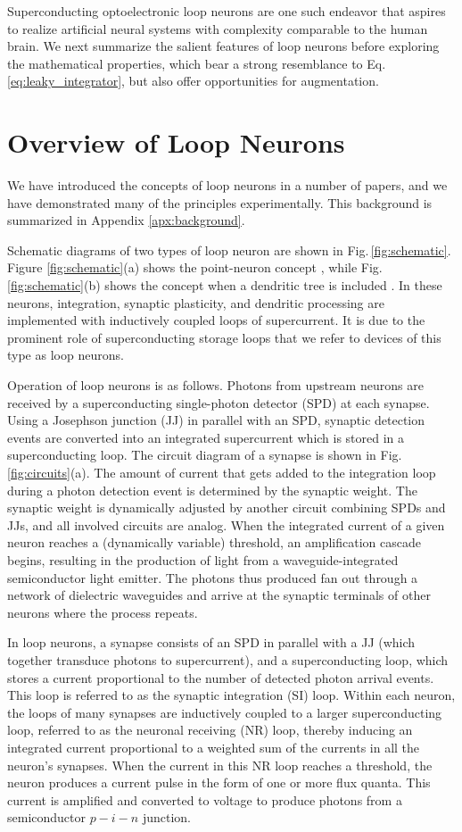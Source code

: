 \documentclass[twocolumn]{article}
\begin{document}
Superconducting optoelectronic loop neurons are one such endeavor that aspires to realize artificial neural systems with complexity comparable to the human brain. We next summarize the salient features of loop neurons before exploring the mathematical properties, which bear a strong resemblance to Eq.\,\ref{eq:leaky_integrator}, but also offer opportunities for augmentation.
 

\section{\label{sec:overview_of_loop_neurons}Overview of Loop Neurons}
We have introduced the concepts of loop neurons in a number of papers, and we have demonstrated many of the principles experimentally. This background is summarized in Appendix \ref{apx:background}. 

Schematic diagrams of two types of loop neuron are shown in Fig.\,\ref{fig:schematic}. Figure \ref{fig:schematic}(a) shows the point-neuron concept \cite{sh2018,sh2019_jap}, while Fig.\,\ref{fig:schematic}(b) shows the concept when a dendritic tree is included \cite{sh2019_jstqe}. In these neurons, integration, synaptic plasticity, and dendritic processing are implemented with inductively coupled loops of supercurrent. It is due to the prominent role of superconducting storage loops that we refer to devices of this type as loop neurons. 

Operation of loop neurons is as follows. Photons from upstream neurons are received by a superconducting single-photon detector (SPD) at each synapse. Using a Josephson junction (JJ) in parallel with an SPD, synaptic detection events are converted into an integrated supercurrent which is stored in a superconducting loop. The circuit diagram of a synapse is shown in Fig.\,\ref{fig:circuits}(a). The amount of current that gets added to the integration loop during a photon detection event is determined by the synaptic weight. The synaptic weight is dynamically adjusted by another circuit combining SPDs and JJs, and all involved circuits are analog. When the integrated current of a given neuron reaches a (dynamically variable) threshold, an amplification cascade begins, resulting in the production of light from a waveguide-integrated semiconductor light emitter. The photons thus produced fan out through a network of dielectric waveguides and arrive at the synaptic terminals of other neurons where the process repeats. 

In loop neurons, a synapse consists of an SPD in parallel with a JJ (which together transduce photons to supercurrent), and a superconducting loop, which stores a current proportional to the number of detected photon arrival events. This loop is referred to as the synaptic integration (SI) loop. Within each neuron, the loops of many synapses are inductively coupled to a larger superconducting loop, referred to as the neuronal receiving (NR) loop, thereby inducing an integrated current proportional to a weighted sum of the currents in all the neuron's synapses. When the current in this NR loop reaches a threshold, the neuron produces a current pulse in the form of one or more flux quanta. This current is amplified and converted to voltage to produce photons from a semiconductor $p-i-n$ junction.
\end{document}
